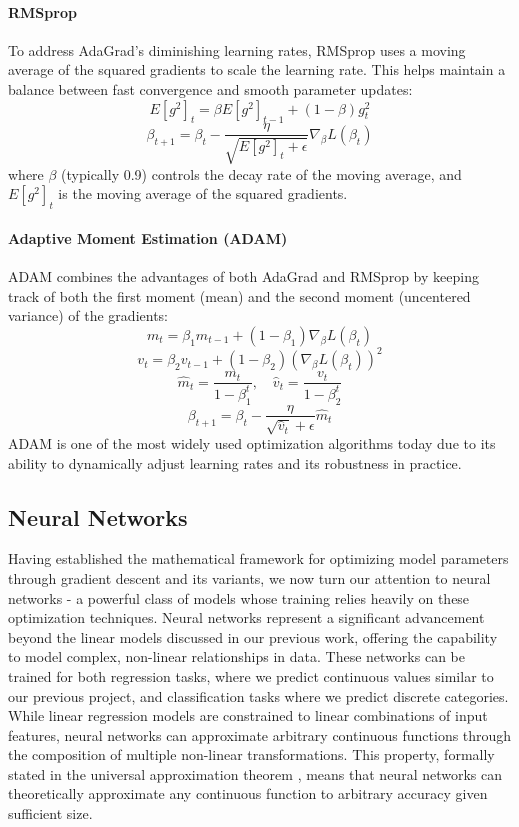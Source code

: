 \documentclass[aps,pra,english,notitlepage,reprint,nofootinbib]{revtex4-1}  %
\begin{document}
\paragraph*{RMSprop}
 To address AdaGrad's diminishing learning rates, RMSprop uses a moving average of the squared gradients to scale the learning rate. This helps maintain a balance between fast convergence and smooth parameter updates:
  \[
  E[g^2]_t = \beta E[g^2]_{t-1} + (1 - \beta) g_t^2
  \]
  \[
  \beta_{t+1} = \beta_t - \frac{\eta}{\sqrt{E[g^2]_t + \epsilon}} \nabla_\beta L(\beta_t)
  \]
  where \( \beta \) (typically 0.9) controls the decay rate of the moving average, and \( E[g^2]_t \) is the moving average of the squared gradients.

\paragraph*{Adaptive Moment Estimation (ADAM)}
 ADAM combines the advantages of both AdaGrad and RMSprop by keeping track of both the first moment (mean) and the second moment (uncentered variance) of the gradients:
  \[
  m_t = \beta_1 m_{t-1} + (1 - \beta_1) \nabla_\beta L(\beta_t)
  \]
  \[
  v_t = \beta_2 v_{t-1} + (1 - \beta_2) (\nabla_\beta L(\beta_t))^2
  \]
  \[
  \hat{m}_t = \frac{m_t}{1 - \beta_1^t}, \quad \hat{v}_t = \frac{v_t}{1 - \beta_2^t}
  \]
  \[
  \beta_{t+1} = \beta_t - \frac{\eta}{\sqrt{\hat{v}_t} + \epsilon} \hat{m}_t
  \]
  ADAM is one of the most widely used optimization algorithms today due to its ability to dynamically adjust learning rates and its robustness in practice.

\subsection{Neural Networks}

Having established the mathematical framework for optimizing model parameters through gradient descent and its variants, we now turn our attention to neural networks - a powerful class of models whose training relies heavily on these optimization techniques. Neural networks represent a significant advancement beyond the linear models discussed in our previous work, offering the capability to model complex, non-linear relationships in data. These networks can be trained for both regression tasks, where we predict continuous values similar to our previous project, and classification tasks where we predict discrete categories. While linear regression models are constrained to linear combinations of input features, neural networks can approximate arbitrary continuous functions through the composition of multiple non-linear transformations. This property, formally stated in the universal approximation theorem \cite{uniapproxtheorem}, means that neural networks can theoretically approximate any continuous function to arbitrary accuracy given sufficient size.
\end{document}
